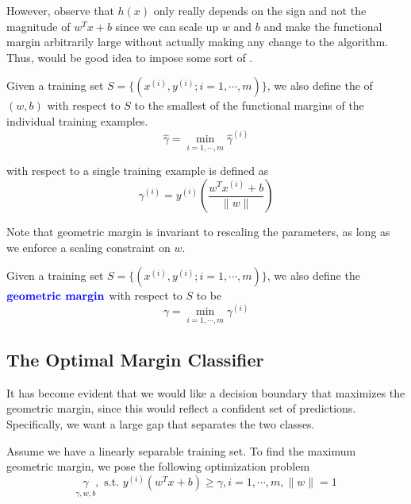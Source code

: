 \documentclass[12pt]{scrartcl}
\begin{document}
However, observe that $h(x)$ only really depends on the sign and not the magnitude of $w^Tx+b$ since we can scale up $w$ and $b$ and make the functional margin arbitrarily large without actually making any change to the algorithm. Thus, would be good idea to impose some sort of .

\begin{definition}
    Given a training set $S = \{(x^{(i)}, y^{(i)}; i = 1, \cdots, m)\}$, we also define the  of $(w,b)$ with respect to $S$ to the smallest of the functional margins of the individual training examples. 
    \[\hat \gamma = \underset{i = 1, \cdots, m}{\min}\hat \gamma^{(i)}\]
\end{definition}

\begin{definition}
     with respect to a single training example is defined as 
    \[\gamma^{(i)} = y^{(i)}\left(\frac{w^Tx^{(i)} + b}{\lVert w\rVert}\right)\]
\end{definition}

\begin{note}
    Note that geometric margin is invariant to rescaling the parameters, as long as we enforce a scaling constraint on $w$.
\end{note}

\begin{definition}
    Given a training set $S = \{(x^{(i)}, y^{(i)}; i = 1, \cdots, m)\}$, we also define the $\textbf{\color{blue} geometric margin}$ with respect to $S$ to be
    \[\gamma = \underset{i = 1, \cdots, m}{\min}\gamma^{(i)}\]
\end{definition}

\subsection{The Optimal Margin Classifier}

It has become evident that we would like a decision boundary that maximizes the geometric margin, since this would reflect a confident set of predictions. Specifically, we want a large gap that separates the two classes.

\begin{example}
    Assume we have a linearly separable training set. To find the maximum geometric margin, we pose the following optimization problem
\[\underset{\gamma, w, b}{\gamma}, \text{ s.t. } y^{(i)} (w^Tx + b) \geq \gamma, i = 1, \cdots, m, \lVert w \rVert = 1\]
\end{example}
\end{document}
